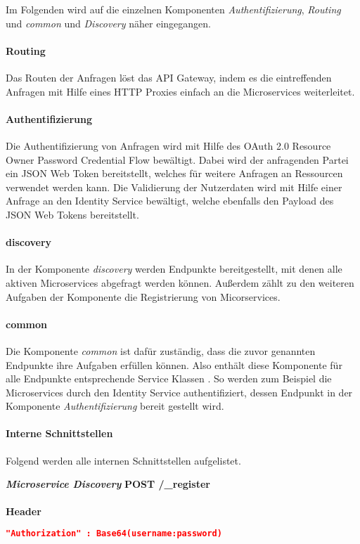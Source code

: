 Im Folgenden wird auf die einzelnen Komponenten \textit{Authentifizierung}, \textit{Routing}  und \textit{common} und \textit{Discovery} näher eingegangen.

\paragraph{Routing}
Das Routen der Anfragen löst das API Gateway, indem es die eintreffenden Anfragen mit Hilfe eines HTTP Proxies einfach an die Microservices weiterleitet.

\paragraph{Authentifizierung}
Die Authentifizierung von Anfragen wird mit Hilfe des OAuth 2.0 Resource Owner Password Credential Flow \cite[p. 37]{oauth2.0:authorizationframework} bewältigt.
Dabei wird der anfragenden Partei ein JSON Web Token bereitstellt, welches für weitere Anfragen an Ressourcen verwendet werden kann.
Die Validierung der Nutzerdaten wird mit Hilfe einer Anfrage an den Identity Service bewältigt, welche ebenfalls den Payload des JSON Web Tokens bereitstellt.

\paragraph{discovery}
In der Komponente \textit{discovery} werden Endpunkte bereitgestellt, mit denen alle aktiven Microservices abgefragt werden können.
Außerdem zählt zu den weiteren Aufgaben der Komponente die Registrierung von Micorservices.

\paragraph{common}
Die Komponente \textit{common} ist dafür zuständig, dass die zuvor genannten Endpunkte ihre Aufgaben erfüllen können.
Also enthält diese Komponente für alle Endpunkte entsprechende Service Klassen .
So werden zum Beispiel die Microservices durch den Identity Service authentifiziert, dessen Endpunkt in der Komponente \textit{Authentifizierung} bereit gestellt wird.
\newline
\paragraph{Interne Schnittstellen}
Folgend werden alle internen Schnittstellen aufgelistet.

\textit{\textbf{Microservice Discovery}}
\newline
\textbf{POST /\_register} \\\\
\textbf{Header}
\begin{lstlisting}[language=json,firstnumber=1,basicstyle=\footnotesize]
"Authorization" : Base64(username:password)
\end{lstlisting}

